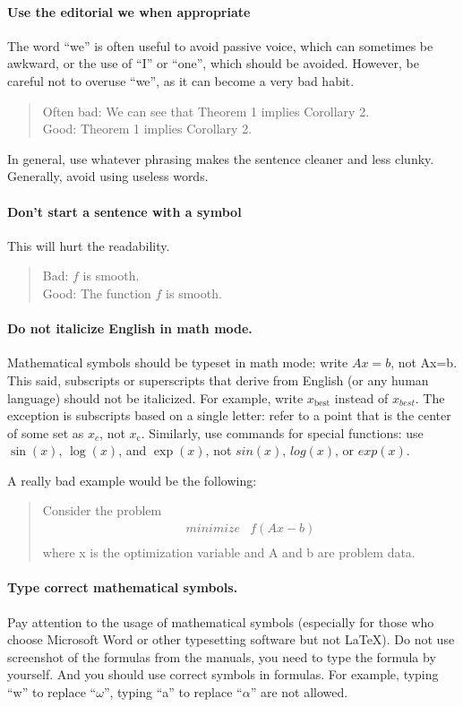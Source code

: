 \paragraph{Use the editorial we when appropriate}
The word “we” is often useful to avoid passive voice, which can sometimes be awkward, or the use of “I” or “one”, which should be avoided. However, be careful not to overuse “we”, as it can become a very bad habit.
\begin{quote}
Often bad: We can see that Theorem 1 implies Corollary 2.\\
Good: Theorem 1 implies Corollary 2.
\end{quote}
In general, use whatever phrasing makes the sentence cleaner and less clunky. Generally, avoid using useless words.

\paragraph{Don’t start a sentence with a symbol} This will hurt the readability.
\begin{quote}
Bad: $f$ is smooth.\\
Good: The function $f$ is smooth.
\end{quote}

\paragraph{Do not italicize English in math mode.}
Mathematical symbols should be typeset in math mode:
write $Ax=b$, not Ax=b. This said, subscripts or
superscripts that derive from English (or any human language) should not be italicized. For example, write 
$x_{\text{best}}$ instead of $x_{best}$. The exception
is subscripts based on a single letter: refer
to a point that is the center of some set as $x_c$, not $x_{\mathrm{c}}$.
Similarly, use commands for special functions: use $\sin(x)$,
$\log(x)$, and $\exp(x)$, not $sin(x)$, $log(x)$, or $exp(x)$.

A really bad example would be the following:
\begin{quote}
Consider the problem
\[
\begin{array}{ll}
minimize & f(Ax - b) \\
\end{array}
\]
where x is the optimization variable and A and b are problem data.
\end{quote}

\paragraph{Type correct mathematical symbols.} Pay attention to the usage of mathematical symbols (especially for those who choose Microsoft Word or other typesetting software but not \LaTeX). Do not use screenshot of the formulas from the manuals, you need to type the formula by yourself. And you should use correct symbols in formulas. For example, typing ``w'' to replace ``$\omega$'', typing ``a'' to replace ``$\alpha$'' are not allowed.


